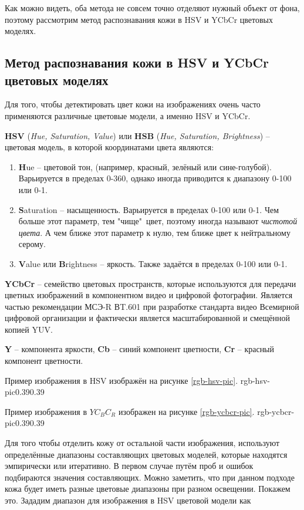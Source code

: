 Как можно видеть, оба метода не совсем точно отделяют нужный объект от фона, поэтому 
рассмотрим метод распознавания кожи в HSV и YCbCr цветовых моделях.

\newpage

\subsection{Метод распознавания кожи в HSV и YCbCr цветовых моделях}

Для того, чтобы детектировать цвет кожи на изображениях очень часто применяются 
различные цветовые модели, а именно HSV и YCbCr.

{\bf HSV} ({\it Hue, Saturation, Value}) или {\bf HSB} ({\it Hue, Saturation, Brightness}) --
цветовая модель, в которой координатами цвета являются:
\begin{enumerate}
	\item {\bf H}ue -- цветовой тон, (например, красный, зелёный или сине-голубой). Варьируется 
в пределах 0-360\textdegree, однако иногда приводится к диапазону 0-100 или 0-1.
	\item {\bf S}aturation -- насыщенность. Варьируется в пределах 0-100 или 0-1. Чем больше
этот параметр, тем "чище"\ цвет, поэтому иногда называют {\it чистотой цвета}. А чем ближе этот
параметр к нулю, тем ближе цвет к нейтральному серому.
	\item {\bf V}alue или {\bf B}rightness -- яркость. Также задаётся в пределах 0-100 или 0-1.
\end{enumerate}

{\bf YCbCr} -- семейство цветовых пространств, которые используются для передачи цветных
изображений в компонентном видео и цифровой фотографии. Является частью рекомендации 
МСЭ-R ВT.601 при разработке стандарта видео Всемирной цифровой организации и фактически
является масштабированной и смещённой копией YUV. 

{\bf Y} -- компонента яркости, {\bf Cb} -- синий компонент цветности, 
{\bf Cr} -- красный компонент цветности.

Пример изображения в HSV изображён на рисунке \ref{rgb-hsv-pic}.
{rgb-hsv-pic}{0.39}{0.39}

Пример изображения в $YC_BC_R$ изображен на рисунке \ref{rgb-ycbcr-pic}.
{rgb-ycbcr-pic}{0.39}{0.39}

Для того чтобы отделить кожу от остальной части изображения, 
используют определённые диапазоны составляющих цветовых моделей, 
которые находятся эмпирически или итеративно. В первом случае путём 
проб и ошибок подбираются значения составляющих. Можно заметить,
что при данном подходе кожа будет иметь разные цветовые диапазоны
при разном освещении. Покажем это. Зададим диапазон для 
изображения в HSV цветовой модели как

